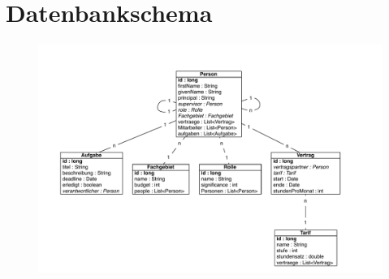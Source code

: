 \documentclass[article,colorback,accentcolor=tud2c]{tudreport}
\begin{document}
\section{Datenbankschema} %
\label{sec:datenbankschema}

\begin{figure}[h]
    \begin{center}
        \includegraphics[scale=0.65]{img/db}
    \end{center}
\end{figure}

\end{document}
